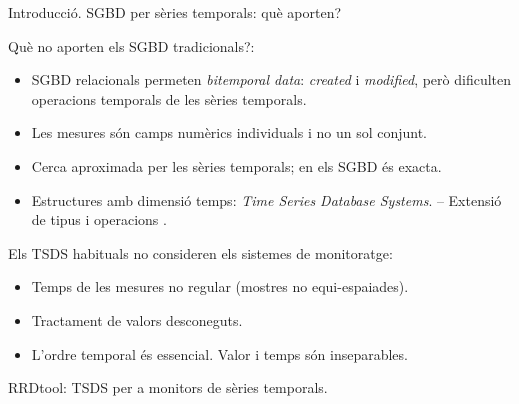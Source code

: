 \begin{frame}{Introducció. SGBD per sèries temporals: què aporten?}

Què no aporten els SGBD tradicionals?:
\begin{itemize}
\item SGBD relacionals permeten \emph{bitemporal data}: \emph{created} i  \emph{modified}, però dificulten operacions temporals de les sèries temporals. 

\item Les mesures són camps numèrics individuals i no un sol conjunt.

\item Cerca aproximada per les sèries temporals; en els SGBD és exacta.

\item Estructures amb dimensió temps: \emph{Time Series Database Systems}. 
\hspace{1cm}-- Extensió de tipus i operacions \parencite{stonebraker86}.

\end{itemize}

\medskip

Els TSDS habituals no consideren els sistemes de monitoratge:
\begin{itemize}
\item Temps de les mesures no regular (mostres no equi-espaiades).
\item Tractament de valors desconeguts.
\item L'ordre temporal és essencial. Valor i temps són inseparables.
\end{itemize}

\medskip

RRDtool: TSDS per a monitors de sèries temporals.


\end{frame}

